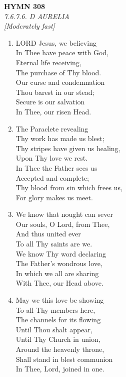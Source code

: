 \documentclass[11pt,a4paper]{article}
\begin{document}
\newpage
\begin{center}
    {\Large \textbf{HYMN 308}}
    \\
    \textit{7.6.7.6. D AURELIA}
    \\
    \textit{\small [Moderately fast]}
\end{center}
\vspace{1em}

\begin{enumerate}
    \item LORD Jesus, we believing \\
        In Thee have peace with God, \\
        Eternal life receiving, \\
        The purchase of Thy blood. \\
        Our curse and condemnation \\
        Thou barest in our stead; \\
        Secure is our salvation \\
        In Thee, our risen Head.

    \item The Paraclete revealing \\
        Thy work has made us blest; \\
        Thy stripes have given us healing, \\
        Upon Thy love we rest. \\
        In Thee the Father sees us \\
        Accepted and complete; \\
        Thy blood from sin which frees us, \\
        For glory makes us meet.

    \item We know that nought can sever \\
        Our souls, O Lord, from Thee, \\
        And thus united ever \\
        To all Thy saints are we. \\
        We know Thy word declaring \\
        The Father's wondrous love, \\
        In which we all are sharing \\
        With Thee, our Head above.

    \item May we this love be showing \\
        To all Thy members here, \\
        The channels for its flowing \\
        Until Thou shalt appear, \\
        Until Thy Church in union, \\
        Around the heavenly throne, \\
        Shall stand in blest communion \\
        In Thee, Lord, joined in one.

\end{enumerate}
\end{document}
